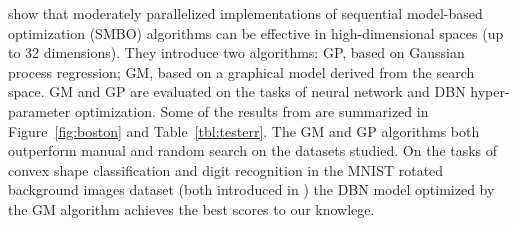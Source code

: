 \documentclass{article}
\renewcommand{\citet}{\cite}
\begin{document}
\citet{nipspaper} show that moderately parallelized implementations
of sequential model-based optimization (SMBO) algorithms can be effective in high-dimensional spaces
(up to 32 dimensions).
They introduce two algorithms: GP, based on Gaussian process regression; GM, based on a graphical model derived from the search space.
GM and GP are evaluated on the tasks of neural network and DBN hyper-parameter optimization.
Some of the results from \citet{nipspaper} are summarized in
Figure~\ref{fig:boston} and Table~\ref{tbl:testerr}.
The GM and GP algorithms both outperform manual and random search on the datasets studied.
On the tasks of convex shape classification and digit recognition in the MNIST rotated background images
dataset (both introduced in \citet{larochelle+etal:2007}) the DBN model optimized by the GM algorithm achieves
the best scores to our knowlege.
\end{document}
